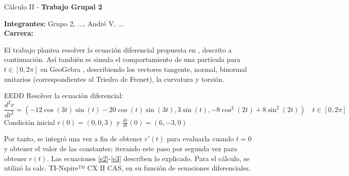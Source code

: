 \documentclass[letterpaper, 11pt]{extarticle}
\begin{document}
\begin{Huge}
    Cálculo II - \textsf{\textbf{Trabajo Grupal 2}} 
    
\end{Huge}

\vspace{2ex}

\textsf{\textbf{Integrantes:}} Grupo 2, ..., André V, ... \\
\textsf{\textbf{Carrera:}} 


\vspace{2ex}

El trabajo plantea resolver la ecuación diferencial propuesta en \citep{TG2C2}, descrito a continuación. Así también se simula el comportamiento de una partícula para $t \in [0,2\pi]$ en GeoGebra \citep{geo}, describiendo los vectores tangente, normal, binormal unitarios (correspondientes al Triedro de Frenet), la curvatura y torsión.

\begin{problem}{EEDD}{}
 Resolver la ecuación diferencial:
\begin{equation}
    \frac{d^2r}{dt^2} = (-12\cos(3t)\sin(t)-20\cos(t)\sin(3t), 3\sin(t), -8\cos^2(2t)+8\sin^2(2t)) \quad t\in[0,2\pi]\label{eedd}
\end{equation}
Condición inicial $r(0) = (0, 0, 3)$ y $\frac{dr}{dt}(0) = (6, -3, 0)$
\end{problem}

Por tanto, se integró una vez a fin de obtener $r'(t)$ para evaluarla cuando $t=0$ y obtener el valor de las constantes; iterando este paso por segunda vez para obtener $r(t)$. Las ecuaciones \ref{e2}-\ref{e3} describen lo explicado. Para el cálculo, se utilizó la calc. TI-Nspire™ CX II CAS, en su función de ecuaciones diferenciales.
\end{document}
